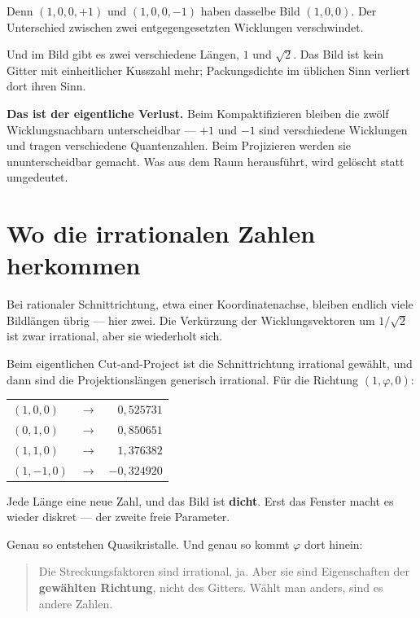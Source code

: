 Denn $(1,0,0,+1)$ und $(1,0,0,-1)$ haben dasselbe Bild $(1,0,0)$. Der
Unterschied zwischen zwei entgegengesetzten Wicklungen verschwindet.

Und im Bild gibt es zwei verschiedene Längen, $1$ und $\sqrt2$. Das
Bild ist kein Gitter mit einheitlicher Kusszahl mehr; Packungsdichte im
üblichen Sinn verliert dort ihren Sinn.

\textbf{Das ist der eigentliche Verlust.} Beim Kompaktifizieren bleiben
die zwölf Wicklungsnachbarn unterscheidbar --- $+1$ und $-1$ sind
verschiedene Wicklungen und tragen verschiedene Quantenzahlen. Beim
Projizieren werden sie ununterscheidbar gemacht. Was aus dem Raum
herausführt, wird gelöscht statt umgedeutet.

\section{Wo die irrationalen Zahlen herkommen}

Bei rationaler Schnittrichtung, etwa einer Koordinatenachse, bleiben
endlich viele Bildlängen übrig --- hier zwei. Die Verkürzung der
Wicklungsvektoren um $1/\sqrt2$ ist zwar irrational, aber sie
wiederholt sich.

Beim eigentlichen Cut-and-Project ist die Schnittrichtung irrational
gewählt, und dann sind die Projektionslängen generisch irrational. Für
die Richtung $(1, \varphi, 0)$:
\begin{center}
\begin{tabular}{lcr}
$(1, 0, 0)$ & $\longrightarrow$ & $0{,}525731$ \\
$(0, 1, 0)$ & $\longrightarrow$ & $0{,}850651$ \\
$(1, 1, 0)$ & $\longrightarrow$ & $1{,}376382$ \\
$(1,-1, 0)$ & $\longrightarrow$ & $-0{,}324920$ \\
\end{tabular}
\end{center}

Jede Länge eine neue Zahl, und das Bild ist \textbf{dicht}. Erst das
Fenster macht es wieder diskret --- der zweite freie Parameter.

Genau so entstehen Quasikristalle. Und genau so kommt $\varphi$ dort
hinein:

\begin{quote}
Die Streckungsfaktoren sind irrational, ja. Aber sie sind Eigenschaften
der \textbf{gewählten Richtung}, nicht des Gitters. Wählt man anders,
sind es andere Zahlen.
\end{quote}

